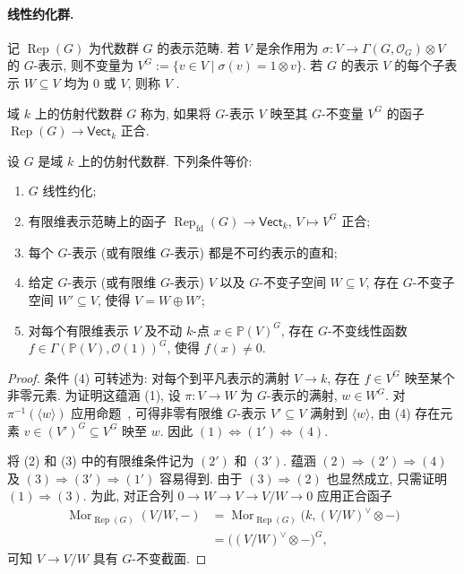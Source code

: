 \paragraph{线性约化群.}
记 $\operatorname{Rep}(G)$ 为代数群 $G$ 的表示范畴. 若 $V$ 是余作用为 $\sigma:V\to\Gamma(G,\mathcal O_G)\otimes V$ 的 $G$-表示, 则不变量为 $V^G:=\{v\in V\mid\sigma(v)=1\otimes v\}$. 若 $G$ 的表示 $V$ 的每个子表示 $W\subseteq V$ 均为 $0$ 或 $V$, 则称 $V$ .
\begin{definition}\label{src:B.1.37}
域 $k$ 上的仿射代数群 $G$ 称为, 如果将 $G$-表示 $V$ 映至其 $G$-不变量 $V^G$ 的函子 $\operatorname{Rep}(G)\to\mathsf{Vect}_k$ 正合.
\end{definition}
\begin{proposition}\label{src:B.1.38}
设 $G$ 是域 $k$ 上的仿射代数群. 下列条件等价:
\begin{enumerate}[(1)]
\item $G$ 线性约化;
\item[(\theenumi$'$)] 有限维表示范畴上的函子 $\operatorname{Rep}_{\mathrm{fd}}(G)\to\mathsf{Vect}_k$, $V\mapsto V^G$ 正合;
\item 每个 $G$-表示 (或有限维 $G$-表示) 都是不可约表示的直和;
\item 给定 $G$-表示 (或有限维 $G$-表示) $V$ 以及 $G$-不变子空间 $W\subseteq V$, 存在 $G$-不变子空间 $W'\subseteq V$, 使得 $V=W\oplus W'$;
\item 对每个有限维表示 $V$ 及不动 $k$-点 $x\in\mathbb P(V)^G$, 存在 $G$-不变线性函数 $f\in\Gamma(\mathbb P(V),\mathcal O(1))^G$, 使得 $f(x)\ne0$.
\end{enumerate}
\end{proposition}
\begin{proof}
条件 (4) 可转述为: 对每个到平凡表示的满射 $V\to k$, 存在 $f\in V^G$ 映至某个非零元素. 为证明这蕴涵 (1), 设 $\pi:V\to W$ 为 $G$-表示的满射, $w\in W^G$. 对 $\pi^{-1}(\langle w\rangle)$ 应用命题~, 可得非零有限维 $G$-表示 $V'\subseteq V$ 满射到 $\langle w\rangle$, 由 (4) 存在元素 $v\in(V')^G\subseteq V^G$ 映至 $w$. 因此 $(1)\Longleftrightarrow(1')\Longleftrightarrow(4)$.

将 (2) 和 (3) 中的有限维条件记为 $(2')$ 和 $(3')$. 蕴涵 $(2)\Longrightarrow(2')\Longrightarrow(4)$ 及 $(3)\Longrightarrow(3')\Longrightarrow(1')$ 容易得到. 由于 $(3)\Longrightarrow(2)$ 也显然成立, 只需证明 $(1)\Longrightarrow(3)$. 为此, 对正合列 $0\to W\to V\to V/W\to0$ 应用正合函子
\[
\begin{aligned}
\operatorname{Mor}_{\operatorname{Rep}(G)}(V/W,-)
&=\operatorname{Mor}_{\operatorname{Rep}(G)}\bigl(k,(V/W)^\vee\otimes-\bigr)\\
&=\bigl((V/W)^\vee\otimes-\bigr)^G,
\end{aligned}
\]
可知 $V\to V/W$ 具有 $G$-不变截面.
\end{proof}
